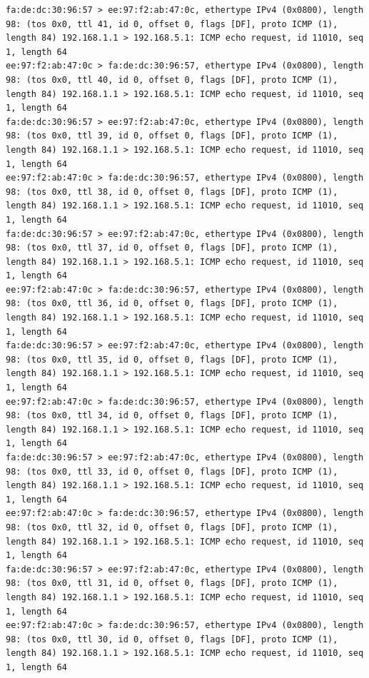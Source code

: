 \documentclass[a4paper,12pt]{article}
\begin{document}
\begin{Verbatim}
fa:de:dc:30:96:57 > ee:97:f2:ab:47:0c, ethertype IPv4 (0x0800), length 98: (tos 0x0, ttl 41, id 0, offset 0, flags [DF], proto ICMP (1), length 84) 192.168.1.1 > 192.168.5.1: ICMP echo request, id 11010, seq 1, length 64
ee:97:f2:ab:47:0c > fa:de:dc:30:96:57, ethertype IPv4 (0x0800), length 98: (tos 0x0, ttl 40, id 0, offset 0, flags [DF], proto ICMP (1), length 84) 192.168.1.1 > 192.168.5.1: ICMP echo request, id 11010, seq 1, length 64
fa:de:dc:30:96:57 > ee:97:f2:ab:47:0c, ethertype IPv4 (0x0800), length 98: (tos 0x0, ttl 39, id 0, offset 0, flags [DF], proto ICMP (1), length 84) 192.168.1.1 > 192.168.5.1: ICMP echo request, id 11010, seq 1, length 64
ee:97:f2:ab:47:0c > fa:de:dc:30:96:57, ethertype IPv4 (0x0800), length 98: (tos 0x0, ttl 38, id 0, offset 0, flags [DF], proto ICMP (1), length 84) 192.168.1.1 > 192.168.5.1: ICMP echo request, id 11010, seq 1, length 64
fa:de:dc:30:96:57 > ee:97:f2:ab:47:0c, ethertype IPv4 (0x0800), length 98: (tos 0x0, ttl 37, id 0, offset 0, flags [DF], proto ICMP (1), length 84) 192.168.1.1 > 192.168.5.1: ICMP echo request, id 11010, seq 1, length 64
ee:97:f2:ab:47:0c > fa:de:dc:30:96:57, ethertype IPv4 (0x0800), length 98: (tos 0x0, ttl 36, id 0, offset 0, flags [DF], proto ICMP (1), length 84) 192.168.1.1 > 192.168.5.1: ICMP echo request, id 11010, seq 1, length 64
fa:de:dc:30:96:57 > ee:97:f2:ab:47:0c, ethertype IPv4 (0x0800), length 98: (tos 0x0, ttl 35, id 0, offset 0, flags [DF], proto ICMP (1), length 84) 192.168.1.1 > 192.168.5.1: ICMP echo request, id 11010, seq 1, length 64
ee:97:f2:ab:47:0c > fa:de:dc:30:96:57, ethertype IPv4 (0x0800), length 98: (tos 0x0, ttl 34, id 0, offset 0, flags [DF], proto ICMP (1), length 84) 192.168.1.1 > 192.168.5.1: ICMP echo request, id 11010, seq 1, length 64
fa:de:dc:30:96:57 > ee:97:f2:ab:47:0c, ethertype IPv4 (0x0800), length 98: (tos 0x0, ttl 33, id 0, offset 0, flags [DF], proto ICMP (1), length 84) 192.168.1.1 > 192.168.5.1: ICMP echo request, id 11010, seq 1, length 64
ee:97:f2:ab:47:0c > fa:de:dc:30:96:57, ethertype IPv4 (0x0800), length 98: (tos 0x0, ttl 32, id 0, offset 0, flags [DF], proto ICMP (1), length 84) 192.168.1.1 > 192.168.5.1: ICMP echo request, id 11010, seq 1, length 64
fa:de:dc:30:96:57 > ee:97:f2:ab:47:0c, ethertype IPv4 (0x0800), length 98: (tos 0x0, ttl 31, id 0, offset 0, flags [DF], proto ICMP (1), length 84) 192.168.1.1 > 192.168.5.1: ICMP echo request, id 11010, seq 1, length 64
ee:97:f2:ab:47:0c > fa:de:dc:30:96:57, ethertype IPv4 (0x0800), length 98: (tos 0x0, ttl 30, id 0, offset 0, flags [DF], proto ICMP (1), length 84) 192.168.1.1 > 192.168.5.1: ICMP echo request, id 11010, seq 1, length 64

\end{Verbatim}
\end{document}
